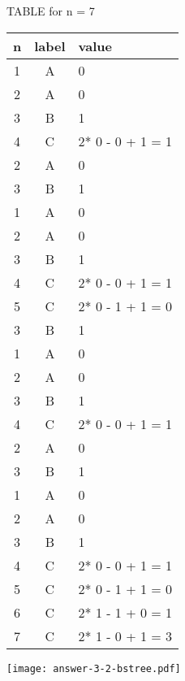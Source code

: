 \documentclass[a4paper]{article}
\begin{document}
TABLE for n = 7

\begin{tabular}{|c|c|l|}
\hline
n & label & value \\
\hline
1  & A & 0 \\
2  & A & 0 \\
3  & B & 1 \\
4  & C & 2* 0 - 0 + 1 = 1 \\
2  & A & 0 \\
3  & B & 1 \\
1  & A & 0 \\
2  & A & 0 \\
3  & B & 1 \\
4  & C & 2* 0 - 0 + 1 = 1 \\
5  & C & 2* 0 - 1 + 1 = 0 \\
3  & B & 1 \\
1  & A & 0 \\
2  & A & 0 \\
3  & B & 1 \\
4  & C & 2* 0 - 0 + 1 = 1 \\
2  & A & 0 \\
3  & B & 1 \\
1  & A & 0 \\
2  & A & 0 \\
3  & B & 1 \\
4  & C & 2* 0 - 0 + 1 = 1 \\
5  & C & 2* 0 - 1 + 1 = 0 \\
6  & C & 2* 1 - 1 + 0 = 1 \\
7  & C & 2* 1 - 0 + 1 = 3 \\
\hline
\end{tabular}

\texttt{[image: answer-3-2-bstree.pdf]}
\end{document}
